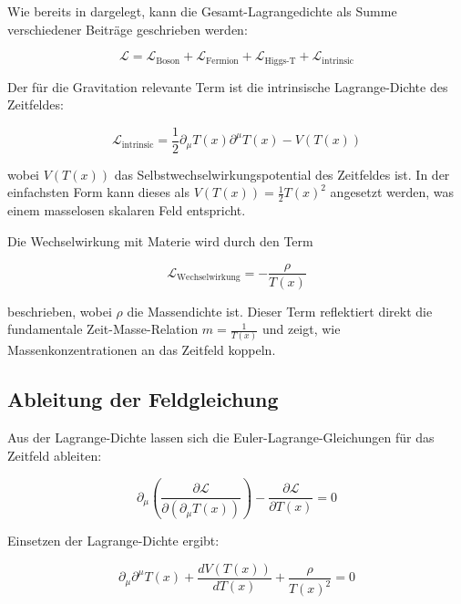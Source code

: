 \documentclass[12pt,a4paper]{article}
\newcommand{\Tfield}{T(x)}
\begin{document}
	Wie bereits in \cite{pascher_messdifferenzen_2025} dargelegt, kann die Gesamt-Lagrangedichte als Summe verschiedener Beiträge geschrieben werden:
	
	\begin{equation}
		\mathcal{L} = \mathcal{L}_{\text{Boson}} + \mathcal{L}_{\text{Fermion}} + \mathcal{L}_{\text{Higgs-T}} + \mathcal{L}_{\text{intrinsic}}
	\end{equation}
	
	Der für die Gravitation relevante Term ist die intrinsische Lagrange-Dichte des Zeitfeldes:
	
	\begin{equation}
		\mathcal{L}_{\text{intrinsic}} = \frac{1}{2} \partial_\mu \Tfield \partial^\mu \Tfield - V(\Tfield)
	\end{equation}
	
	wobei \(V(\Tfield)\) das Selbstwechselwirkungspotential des Zeitfeldes ist. In der einfachsten Form kann dieses als \(V(\Tfield) = \frac{1}{2} \Tfield^2\) angesetzt werden, was einem masselosen skalaren Feld entspricht.
	
	Die Wechselwirkung mit Materie wird durch den Term
	
	\begin{equation}
		\mathcal{L}_{\text{Wechselwirkung}} = -\frac{\rho}{\Tfield}
	\end{equation}
	
	beschrieben, wobei \(\rho\) die Massendichte ist. Dieser Term reflektiert direkt die fundamentale Zeit-Masse-Relation \(m = \frac{1}{\Tfield}\) und zeigt, wie Massenkonzentrationen an das Zeitfeld koppeln.
	
	\subsection{Ableitung der Feldgleichung}
	Aus der Lagrange-Dichte lassen sich die Euler-Lagrange-Gleichungen für das Zeitfeld ableiten:
	
	\begin{equation}
		\partial_\mu \left( \frac{\partial \mathcal{L}}{\partial(\partial_\mu \Tfield)} \right) - \frac{\partial \mathcal{L}}{\partial \Tfield} = 0
	\end{equation}
	
	Einsetzen der Lagrange-Dichte ergibt:
	
	\begin{equation}
		\partial_\mu \partial^\mu \Tfield + \frac{dV(\Tfield)}{d\Tfield} + \frac{\rho}{\Tfield^2} = 0
	\end{equation}
	
\end{document}
